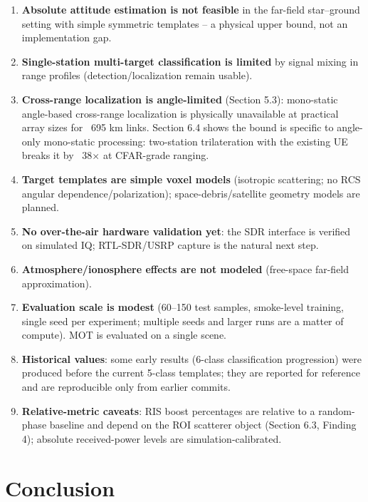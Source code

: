 \documentclass[11pt]{article}
\begin{document}
\begin{enumerate}
\item \textbf{Absolute attitude estimation is not feasible} in the far-field star--ground setting with simple symmetric templates -- a physical upper bound, not an implementation gap.
\item \textbf{Single-station multi-target classification is limited} by signal mixing in range profiles (detection/localization remain usable).
\item \textbf{Cross-range localization is angle-limited} (Section 5.3): mono-static angle-based cross-range localization is physically unavailable at practical array sizes for ~695 km links. Section 6.4 shows the bound is specific to angle-only mono-static processing: two-station trilateration with the existing UE breaks it by ~38$\times$ at CFAR-grade ranging.
\item \textbf{Target templates are simple voxel models} (isotropic scattering; no RCS angular dependence/polarization); space-debris/satellite geometry models are planned.
\item \textbf{No over-the-air hardware validation yet}: the SDR interface is verified on simulated IQ; RTL-SDR/USRP capture is the natural next step.
\item \textbf{Atmosphere/ionosphere effects are not modeled} (free-space far-field approximation).
\item \textbf{Evaluation scale is modest} (60--150 test samples, smoke-level training, single seed per experiment; multiple seeds and larger runs are a matter of compute). MOT is evaluated on a single scene.
\item \textbf{Historical values}: some early results (6-class classification progression) were produced before the current 5-class templates; they are reported for reference and are reproducible only from earlier commits.
\item \textbf{Relative-metric caveats}: RIS boost percentages are relative to a random-phase baseline and depend on the ROI scatterer object (Section 6.3, Finding 4); absolute received-power levels are simulation-calibrated.
\end{enumerate}


\section{Conclusion}
\end{document}

